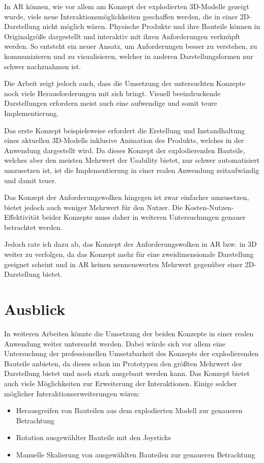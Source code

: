 In AR können, wie vor allem am Konzept der explodierten 3D-Modelle gezeigt wurde, viele neue Interaktionsmöglichkeiten geschaffen werden, die in einer 2D-Darstellung nicht möglich wären.
Physische Produkte und ihre Bauteile können in Originalgröße dargestellt und interaktiv mit ihren Anforderungen verknüpft werden.
So entsteht ein neuer Ansatz, um Anforderungen besser zu verstehen, zu kommunizieren und zu visualisieren, welcher in anderen Darstellungsformen nur schwer nachzuahmen ist.

Die Arbeit zeigt jedoch auch, dass die Umsetzung der untersuchten Konzepte noch viele Herausforderungen mit sich bringt.
Visuell beeindruckende Darstellungen erfordern meist auch eine aufwendige und somit teure Implementierung.

Das erste Konzept beispielsweise erfordert die Erstellung und Instandhaltung eines aktuellen 3D-Modells inklusive Animation des Produkts, welches in der Anwendung dargestellt wird.
Da dieses Konzept der explodierenden Bauteile, welches aber den meisten Mehrwert der Usability bietet, nur schwer automatisiert umzusetzen ist, ist die Implementierung in einer realen Anwendung zeitaufwändig und damit teuer.

Das Konzept der Anforderungswolken hingegen ist zwar einfacher umzusetzen, bietet jedoch auch weniger Mehrwert für den Nutzer.
Die Kosten-Nutzen-Effektivität beider Konzepte muss daher in weiteren Untersuchungen genauer betrachtet werden.

Jedoch rate ich dazu ab, das Konzept der Anforderungswolken in AR bzw. in 3D weiter zu verfolgen, da das Konzept mehr für eine zweidimensionale Darstellung geeignet scheint und in AR keinen nennenswerten Mehrwert gegenüber einer 2D-Darstellung bietet.

\section{Ausblick}
\label{section:ausblick}

In weiteren Arbeiten könnte die Umsetzung der beiden Konzepte in einer realen Anwendung weiter untersucht werden.
Dabei würde sich vor allem eine Untersuchung der professionellen Umsetzbarkeit des Konzepts der explodierenden Bauteile anbieten, da dieses schon im Prototypen den größten Mehrwert der Darstellung bietet und noch stark ausgebaut werden kann.
Das Konzept bietet auch viele Möglichkeiten zur Erweiterung der Interaktionen.
Einige solcher möglicher Interaktionserweiterungen wären:
\begin{itemize}
    \item Herausgreifen von Bauteilen aus dem explodierten Modell zur genaueren Betrachtung
    \item Rotation ausgewählter Bauteile mit den Joysticks
    \item Manuelle Skalierung von ausgewählten Bauteilen zur genaueren Betrachtung
\end{itemize}

